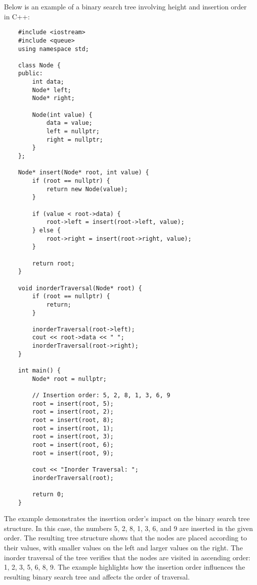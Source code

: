 \begin{solution}
    Below is an example of a binary search tree involving height and insertion order in C++:

    \horizontalline

    \begin{verbatim}
    #include <iostream>
    #include <queue>
    using namespace std;
    
    class Node {
    public:
        int data;
        Node* left;
        Node* right;
    
        Node(int value) {
            data = value;
            left = nullptr;
            right = nullptr;
        }
    };
    
    Node* insert(Node* root, int value) {
        if (root == nullptr) {
            return new Node(value);
        }
    
        if (value < root->data) {
            root->left = insert(root->left, value);
        } else {
            root->right = insert(root->right, value);
        }
    
        return root;
    }
    
    void inorderTraversal(Node* root) {
        if (root == nullptr) {
            return;
        }
    
        inorderTraversal(root->left);
        cout << root->data << " ";
        inorderTraversal(root->right);
    }
    
    int main() {
        Node* root = nullptr;
    
        // Insertion order: 5, 2, 8, 1, 3, 6, 9
        root = insert(root, 5);
        root = insert(root, 2);
        root = insert(root, 8);
        root = insert(root, 1);
        root = insert(root, 3);
        root = insert(root, 6);
        root = insert(root, 9);
    
        cout << "Inorder Traversal: ";
        inorderTraversal(root);
    
        return 0;
    }
    \end{verbatim}

    \horizontalline

    The example demonstrates the insertion order's impact on the binary search tree structure. In this case, the numbers 5, 2, 8, 1, 3, 6, and 9 are inserted in the given order. The resulting tree structure shows that the nodes are placed according to their values, with smaller values on the left and larger values on the right. 
    The inorder traversal of the tree verifies that the nodes are visited in ascending order: 1, 2, 3, 5, 6, 8, 9. The example highlights how the insertion order influences the resulting binary search tree and affects the order of traversal.
\end{solution}

